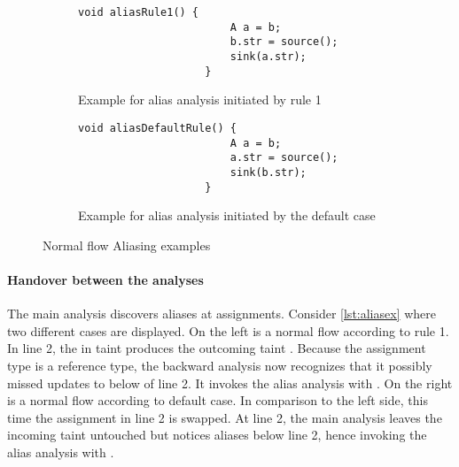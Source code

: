 \documentclass[../draft.tex]{subfiles}
\begin{document}
    \begin{figure}[tbp]
        \centering
        \begin{subfigure}[b]{0.45\textwidth}
            \centering
            \begin{adjustbox}{max width=\columnwidth}
                \begin{lstlisting}[gobble=20]
                    void aliasRule1() {
                        A a = b;
                        b.str = source();
                        sink(a.str);
                    }
                \end{lstlisting}
            \end{adjustbox}
            \caption{Example for alias analysis initiated by rule 1}
            \label{lst:aliasex_a}
        \end{subfigure}
        \hfill
        \begin{subfigure}[b]{0.45\textwidth}
            \centering
            \begin{adjustbox}{max width=\columnwidth}
                \begin{lstlisting}[gobble=20]
                    void aliasDefaultRule() {
                        A a = b;
                        a.str = source();
                        sink(b.str);
                    }
                \end{lstlisting}
            \end{adjustbox}
            \caption{Example for alias analysis initiated by the default case}
            \label{lst:aliasex_b}
        \end{subfigure}
        \caption{Normal flow Aliasing examples}
        \label{lst:aliasex}
    \end{figure}

    \paragraph{Handover between the analyses}
    The main analysis discovers aliases at assignments.
    Consider \autoref{lst:aliasex} where two different cases are displayed.
    On the left is a normal flow according to rule 1.
    In line 2, the in taint  produces the outcoming taint .
    Because the assignment type is a reference type, the backward analysis now recognizes that it possibly missed updates to  below of line 2.
    It invokes the alias analysis with .
    On the right is a normal flow according to default case.
    In comparison to the left side, this time the assignment in line 2 is swapped.
    At line 2, the main analysis leaves the incoming taint  untouched but notices  aliases  below line 2, hence invoking the alias analysis with .
\end{document}
